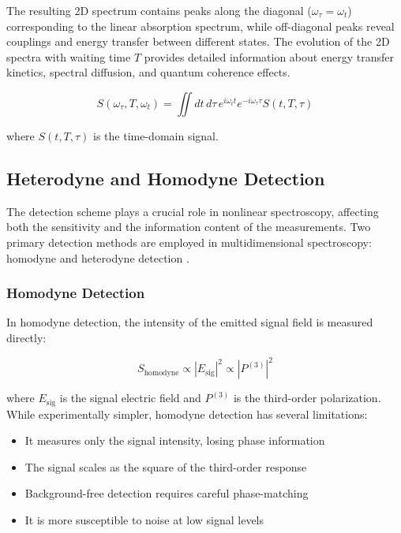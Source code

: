 \noindent The resulting 2D spectrum contains peaks along the diagonal ($\omega_\tau = \omega_t$) corresponding to the linear absorption spectrum, while off-diagonal peaks reveal couplings and energy transfer between different states. The evolution of the 2D spectra with waiting time $T$ provides detailed information about energy transfer kinetics, spectral diffusion, and quantum coherence effects.

\begin{equation}
    S(\omega_\tau, T, \omega_t) = \iint dt\, d\tau\, e^{i\omega_t t} e^{-i\omega_\tau \tau} S(t, T, \tau)
    \label{eq:2des_signal}
\end{equation}

\noindent where $S(t, T, \tau)$ is the time-domain signal.

\subsection{Heterodyne and Homodyne Detection}
\label{subsec:heterodyne_homodyne}

\noindent The detection scheme plays a crucial role in nonlinear spectroscopy, affecting both the sensitivity and the information content of the measurements. Two primary detection methods are employed in multidimensional spectroscopy: homodyne and heterodyne detection \cite{Lepetit1995, Tian2003}.

\subsubsection{Homodyne Detection}
\label{subsubsec:homodyne}

\noindent In homodyne detection, the intensity of the emitted signal field is measured directly:

\begin{equation}
    S_{\text{homodyne}} \propto |E_{\text{sig}}|^2 \propto |P^{(3)}|^2
    \label{eq:homodyne}
\end{equation}

\noindent where $E_{\text{sig}}$ is the signal electric field and $P^{(3)}$ is the third-order polarization. While experimentally simpler, homodyne detection has several limitations:

\begin{itemize}
    \item It measures only the signal intensity, losing phase information
    \item The signal scales as the square of the third-order response
    \item Background-free detection requires careful phase-matching
    \item It is more susceptible to noise at low signal levels
\end{itemize}

